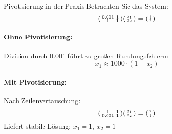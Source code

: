 \begin{example2}{Pivotisierung in der Praxis}
Betrachten Sie das System:
$$\begin{psmallmatrix}
0.001 & 1\\
1 & 1
\end{psmallmatrix}
\begin{psmallmatrix}
x_1\\
x_2
\end{psmallmatrix} = 
\begin{psmallmatrix}
1\\
2
\end{psmallmatrix}$$

\paragraph{Ohne Pivotisierung:}
Division durch 0.001 führt zu großen Rundungsfehlern:
$$x_1 \approx 1000 \cdot (1 - x_2)$$

\paragraph{Mit Pivotisierung:}
Nach Zeilenvertauschung:
$$\begin{psmallmatrix}
1 & 1\\
0.001 & 1
\end{psmallmatrix}
\begin{psmallmatrix}
x_1\\
x_2
\end{psmallmatrix} = 
\begin{psmallmatrix}
2\\
1
\end{psmallmatrix}$$
Liefert stabile Lösung: $x_1 = 1$, $x_2 = 1$
\end{example2}

